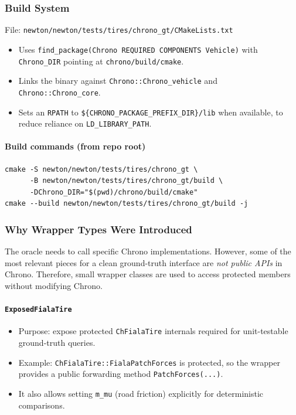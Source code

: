 \subsubsection{Build System}
File: \texttt{newton/newton/tests/tires/chrono\_gt/CMakeLists.txt}

\begin{itemize}
  \item Uses \texttt{find\_package(Chrono REQUIRED COMPONENTS Vehicle)} with \texttt{Chrono\_DIR}
        pointing at \texttt{chrono/build/cmake}.
  \item Links the binary against \texttt{Chrono::Chrono\_vehicle} and \texttt{Chrono::Chrono\_core}.
  \item Sets an \texttt{RPATH} to \texttt{\$\{CHRONO\_PACKAGE\_PREFIX\_DIR\}/lib} when available,
        to reduce reliance on \texttt{LD\_LIBRARY\_PATH}.
\end{itemize}

\paragraph{Build commands (from repo root)}
\begin{verbatim}
cmake -S newton/newton/tests/tires/chrono_gt \
      -B newton/newton/tests/tires/chrono_gt/build \
      -DChrono_DIR="$(pwd)/chrono/build/cmake"
cmake --build newton/newton/tests/tires/chrono_gt/build -j
\end{verbatim}

\subsubsection{Why Wrapper Types Were Introduced}
The oracle needs to call specific Chrono implementations. However, some of the most
relevant pieces for a clean ground-truth interface are \emph{not public APIs} in Chrono.
Therefore, small wrapper classes are used to access protected members without modifying Chrono.

\paragraph{\texttt{ExposedFialaTire}}
\begin{itemize}
  \item Purpose: expose protected \texttt{ChFialaTire} internals required for unit-testable ground-truth queries.
  \item Example: \texttt{ChFialaTire::FialaPatchForces} is protected, so the wrapper provides a
        public forwarding method \texttt{PatchForces(...)}.
  \item It also allows setting \texttt{m\_mu} (road friction) explicitly for deterministic comparisons.
\end{itemize}


